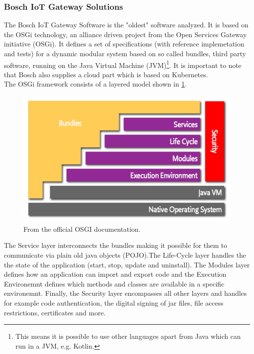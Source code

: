 \subsubsection{Bosch IoT Gateway Solutions}
The Bosch IoT Gateway Software\cite{BoschIoT13:online} is the "oldest" software analyzed. It is based on the OSGi technology\cite{osgiDefintion25:online}, an alliance driven project from the Open Services Gateway initiative (OSGi). It defines a set of specifications (with reference implemetation and tests) for a dynamic modular system based on so called bundles, third party software, running on the Java Virtual Machine (JVM)\footnote{This means it is possible to use other languages apart from Java which can run in a JVM, e.g. Kotlin.}. It is important to note that Bosch also supplies a cloud part which is based on Kubernetes.\\
The OSGi framework consists of a layered model shown in \cref{fig:osgiLayerModel}. 
\begin{figure}[h!]
    \centering
    \includegraphics[scale=0.8]{figures/layering-osgi.png}
    \caption{From the official OSGI documentation\cite{osgiFrameworkArchitec22:online}.}
    \label{fig:osgiLayerModel}
\end{figure}
The Service layer interconnects the bundles making it possible for them to communicate via plain old java objects (POJO).The Life-Cycle layer handles the the state of the application (start, stop, update and uninstall). The Modules layer defines how an application can import and export code and the Execution Environemnt defines which methods and classes are available in a specific environemnt. Finally, the Security layer encompasses all other layers and handles for example code authentication, the digital signing of jar files, file access restrictions, certificates and more.\\
